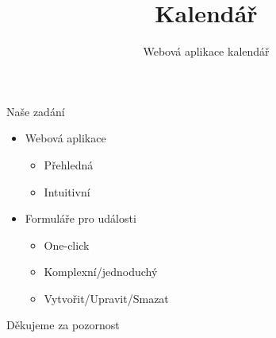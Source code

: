 \documentclass[11pt, hyperref={unicode}]{beamer}
\title{Kalendář}
\subtitle{
	Webová aplikace kalendář
}
\author[[Filip Solich \& Marek Sechra \& Vasil Poposkij]
\institute
{
    \vspace{-0.2cm}
	\scalebox{0.3}{\texttt{[image: img/FIT\_logo.pdf]}}
}
\begin{document}
\maketitle



\begin{frame}{Naše zadání}

\begin{itemize}

\item{Webová aplikace}

    \begin{itemize}
    \item{Přehledná}
    \item{Intuitivní}
    
    \end{itemize}
\vspace{0.5cm}
\item{Formuláře pro události}

    \begin{itemize}
    \item{One-click}
    \item{Komplexní/jednoduchý }
    \item{Vytvořit/Upravit/Smazat}
    \end{itemize}


\end{itemize}


\end{frame}


\begin{frame}{}

\huge
Děkujeme za pozornost
\centering
\end{frame}
\end{document}
